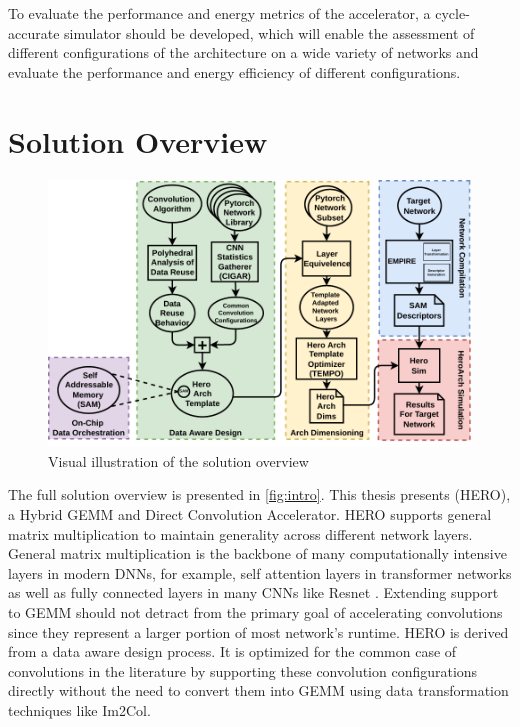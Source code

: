 To evaluate the performance and
energy metrics of the accelerator, a cycle-accurate simulator should be
developed, which will enable the assessment of different configurations of the
architecture on a wide variety of networks and evaluate the performance and
energy efficiency of different configurations.

\section{Solution Overview}
\label{chap:intro:solution_overview}

\begin{figure}[!ht]
  \centering
  \includegraphics[scale=1]{fig/intro.pdf}
  \caption{Visual illustration of the solution overview}
  \label{fig:intro}
\end{figure}


The full solution overview is presented in \autoref{fig:intro}. This thesis
presents (HERO), a Hybrid GEMM and Direct Convolution Accelerator.  
HERO supports general matrix multiplication to maintain generality across
different network layers. General matrix multiplication is the backbone of many
computationally intensive layers in modern DNNs, for example, self attention
layers in transformer networks \cite{transformer_model} as well as fully
connected layers in many CNNs like Resnet \cite{resnet}. Extending support to
GEMM should not detract from the primary goal of accelerating convolutions since
they represent a larger portion of most network's runtime.  
HERO is derived from a data aware design process. It is optimized for the common
case of convolutions in the literature by supporting these convolution
configurations directly without the need to convert them into GEMM using data
transformation techniques like Im2Col.


